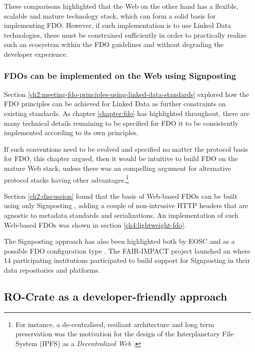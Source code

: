 These comparisons highlighted that the Web on the other hand has a flexible, scalable and mature technology stack, which can form a solid basis for implementing FDO. 
However, if such implementation is to use Linked Data technologies, these must be constrained sufficiently in order to practically realize such an ecosystem within the FDO guidelines and without degrading the developer experience.


\subsubsection{FDOs can be implemented on the Web using Signposting}
\label{ch61:signposting}

Section \vref{ch2:meeting-fdo-principles-using-linked-data-standards} explored how the FDO principles can be achieved for Linked Data as further constraints on existing standards.
As chapter \ref{chapter:fdo} has highlighted throughout, there are many technical details remaining to be specified for FDO it to be consistently implemented according to its own principles.

If such conventions need to be evolved and specified no matter the protocol basis for FDO, this chapter argued, then it would be intuitive to build FDO on the mature Web stack, unless there was an compelling argument for alternative protocol stacks having other advantages.\footnote{
  For instance, a de-centralised, resiliant architecture and long term preservation was the motivation for the design of the Interplanetary File System (IPFS) as a \emph{Decentralized Web} \cite{Trautwein 2022}.
}

Section \ref{ch2:discussion} found that the basis of Web-based FDOs can be built using only \gls{Signposting} \cite{Van de Sompel 2015,Van de Sompel 2022}, adding a couple of non-intrusive HTTP headers that are agnostic to metadata standards and serializations. An implementation of such Web-based FDOs was shown in section \ref{ch4:lightweight-fdo}. 

The Signposting approach has also been highlighted both by \acrshort{EOSC} \cite{Wilkinson 2022a,Wilkinson 2024} and as a possible FDO configuration type \cite{Lannom 2022a}.
The FAIR-IMPACT project launched an  where 14 participating institutions participated to build support for Signposting \cite{Soiland-Reyes 2023b} in their data repositories and platforms.



\subsection{RO-Crate as a developer-friendly approach}
\label{ch61:crate}

